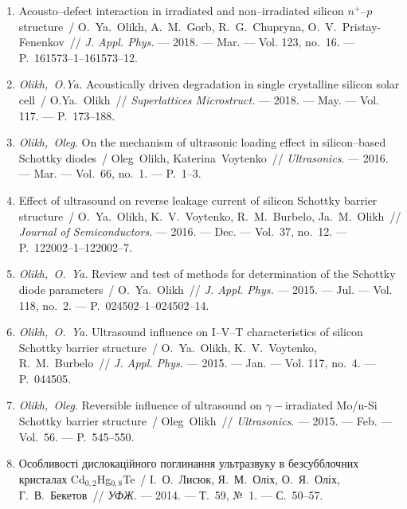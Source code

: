 \begin{center}%
{\textbf{\MakeUppercase{\authorbibtitle}} }
\end{center}%

\begin{enumerate}[label=\arabic*.,leftmargin=1cm,itemindent=0cm]
\item 
Acousto--defect interaction in irradiated and non--irradiated silicon
  $n^+$--$p$ structure~/ O.~Ya.~Olikh, A.~M.~Gorb, R.~G.~Chupryna,
  O.~V.~Pristay-Fenenkov~// \emph{J. Appl. Phys.} --- 2018. --- Mar. ---
 Vol. 123, no.~16. --- P.~161573--1--161573--12.
 
\item 
\emph{Olikh,~O.Ya.} Acoustically driven degradation in single crystalline
  silicon solar cell~/ O.Ya.~Olikh~// \emph{Superlattices Microstruct.} ---
  2018. --- May. ---
  Vol. 117. ---
  P.~173--188.

\item 
\emph{Olikh,~Oleg}. On the mechanism of ultrasonic loading effect in
  silicon--based {S}chottky diodes~/ Oleg~Olikh, Katerina~Voytenko~//
  \emph{Ultrasonics}. ---
  2016. --- Mar. ---
  Vol.~66, no.~1. ---
  P.~1--3.

\item 
Effect of ultrasound on reverse leakage current of silicon {S}chottky barrier
  structure~/ O.~Ya.~Olikh, K.~V.~Voytenko, R.~M.~Burbelo, Ja.~M.~Olikh~//
  \emph{Journal of Semiconductors}. ---
  2016. --- Dec. ---
  Vol.~37, no.~12. ---
  P.~122002--1--122002--7.

\item 
\emph{Olikh,~O.~Ya.} Review and test of methods for determination of the
  {S}chottky diode parameters~/ O.~Ya.~Olikh~// \emph{J. Appl. Phys.} ---
  2015. --- Jul. ---
  Vol. 118, no.~2. ---
  P.~024502--1--024502--14.

\item 
\emph{Olikh,~O.~Ya.} Ultrasound influence on {I}--{V}--{T} characteristics
  of silicon {S}chottky barrier structure~/ O.~Ya.~Olikh, K.~V.~Voytenko,
  R.~M.~Burbelo~// \emph{J. Appl. Phys.} ---
  2015. --- Jan. ---
  Vol. 117, no.~4. ---
  P.~044505.

\item 
\emph{Olikh,~Oleg}. Reversible influence of ultrasound on
  $\gamma-$irradiated {M}o/n-{S}i {S}chottky barrier structure~/ Oleg~Olikh~//
  \emph{Ultrasonics}. ---
  2015. --- Feb. ---
  Vol.~56. ---
  P.~545--550.

\item 
Особливості дислокаційного поглинання
  ультразвуку в безсубблочних кристалах
  {C}d$_{0,2}${H}g$_{0,8}${T}e~/ І.~О.~Лисюк, Я.~М.~Оліх,
  О.~Я.~Оліх, Г.~В.~Бекетов~// \emph{УФЖ}. ---
  2014. ---
  Т.~59, {№}~1. ---
  {С.}~50--57.


\end{enumerate}

